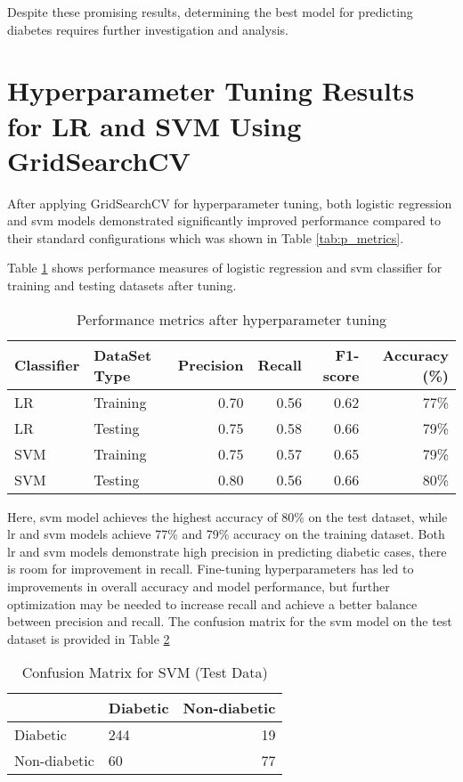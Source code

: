 Despite these promising results, determining the best model for predicting diabetes requires further investigation and analysis.

\section{Hyperparameter Tuning Results for LR and SVM Using GridSearchCV}
After applying GridSearchCV for hyperparameter tuning, both logistic regression and svm models demonstrated significantly improved performance compared to their standard configurations which was shown in Table \ref{tab:p_metrics}. 

Table \ref{tab:gs_p_metrics} shows performance measures of logistic regression and svm classifier for training and testing datasets after tuning.

\begin{table}[h!]
    \centering
    \caption{Performance metrics after hyperparameter tuning}
    \label{tab:gs_p_metrics}
    \begin{tabular}{llrrrr}     
        \toprule
        Classifier  &   DataSet Type &   Precision   &   Recall  &   F1-score    &   Accuracy (\%) \\
        \midrule
        LR  &   Training    &   0.70   &   0.56   &   0.62    &   77\%   \\
        LR  &   Testing &   0.75   &   0.58   &   0.66    &   79\%   \\
        SVM  &   Training    &   0.75   &   0.57   &   0.65    &   79\%   \\
        SVM  &   Testing &   0.80   &   0.56   &   0.66    &   80\%   \\
        \bottomrule
    \end{tabular}
\end{table}

Here, svm model achieves the highest accuracy of 80\% on the test dataset, while lr and svm models achieve 77\% and 79\% accuracy on the training dataset. Both lr and svm models demonstrate high precision in predicting diabetic cases, there is room for improvement in recall. Fine-tuning hyperparameters has led to improvements in overall accuracy and model performance, but further optimization may be needed to increase recall and achieve a better balance between precision and recall. The confusion matrix for the svm model on the test dataset is provided in Table \ref{tab:gs_conf_matrix}

\begin{table}[h!]
    \centering
    \caption{Confusion Matrix for SVM (Test Data)}
    \label{tab:gs_conf_matrix}
    \begin{tabular}{llr}     
        \toprule
        & Diabetic  &   Non-diabetic \\
        \midrule
        Diabetic &  244  &   19   \\
        Non-diabetic &  60    &   77  \\
        \bottomrule
    \end{tabular}
\end{table}

